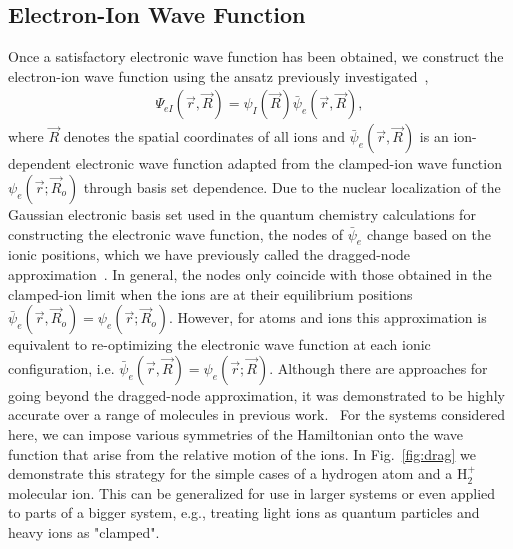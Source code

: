 \documentclass[pra,superscriptaddress,groupedaddress,twocolumn]{revtex4}
\begin{document}
\subsection{Electron-Ion Wave Function}

Once a satisfactory electronic wave function has been obtained, we construct the electron-ion wave function using the ansatz previously investigated~\cite{Tubman_ECG},
\begin{align}
\Psi_{eI}(\vec{r},\vec{R})=\psi_I(\vec{R})\bar{\psi}_e(\vec{r},\vec{R}), \label{eq:psi}
\end{align}
where $\vec{R}$ denotes the spatial coordinates of all ions and $\bar{\psi}_e(\vec{r},\vec{R})$ is an ion-dependent electronic wave function adapted from the clamped-ion wave function $\psi_e(\vec{r};\vec{R}_o)$ through basis set dependence. Due to the nuclear localization of the Gaussian electronic basis set used in the quantum chemistry calculations for constructing the electronic wave function, the nodes of $\bar{\psi}_e$ change based on the ionic positions, which we have previously called the dragged-node approximation~\cite{Tubman_ECG}. In general, the nodes only coincide with those obtained in the clamped-ion limit when the ions are at their equilibrium positions $\bar{\psi}_e(\vec{r},\vec{R}_o)=\psi_e(\vec{r};\vec{R}_o)$. However, for atoms and ions this approximation is equivalent to re-optimizing the electronic wave function at each ionic configuration, i.e. $\bar{\psi}_e(\vec{r},\vec{R})=\psi_e(\vec{r};\vec{R})$. Although there are approaches for going beyond the dragged-node approximation, it was demonstrated to be highly accurate over a range of molecules in previous work.~\cite{Tubman_ECG} For the systems considered here, we can impose various symmetries of the Hamiltonian onto the wave function that arise from the relative motion of the ions. In Fig.~\ref{fig:drag} we demonstrate this strategy for the simple cases of a hydrogen atom and a H$_2^+$ molecular ion. This can be generalized for use in larger systems or even applied to parts of a bigger system, e.g., treating light ions as quantum particles and heavy ions as "clamped".
\end{document}
